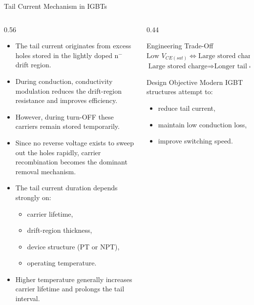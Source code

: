 \begin{frame}{Tail Current Mechanism in IGBTs}
\begin{columns}
\begin{column}{0.56\textwidth}
\begin{itemize}
    \item The tail current originates from excess holes stored in the lightly doped n$^-$ drift region.
    
    \item During conduction, conductivity modulation reduces the drift-region resistance and improves efficiency.
    
    \item However, during turn-OFF these carriers remain stored temporarily.
    
    \item Since no reverse voltage exists to sweep out the holes rapidly, carrier recombination becomes the dominant removal mechanism.
    
    \item The tail current duration depends strongly on:
    \begin{itemize}
        \item carrier lifetime,
        \item drift-region thickness,
        \item device structure (PT or NPT),
        \item operating temperature.
    \end{itemize}
    
    \item Higher temperature generally increases carrier lifetime and prolongs the tail interval.
\end{itemize}
\end{column}

\begin{column}{0.44\textwidth}
\begin{block}{Engineering Trade-Off}
$\text{Low } V_{CE(sat)} \Longleftrightarrow \text{Large stored charge}$
$\text{Large stored charge} \Longrightarrow \text{Longer tail current}$
\end{block}

\vspace{0.15cm}

\begin{block}{Design Objective}
Modern IGBT structures attempt to:
\begin{itemize}
    \item reduce tail current,
    \item maintain low conduction loss,
    \item improve switching speed.
\end{itemize}
\end{block}
\end{column}
\end{columns}
\end{frame}

